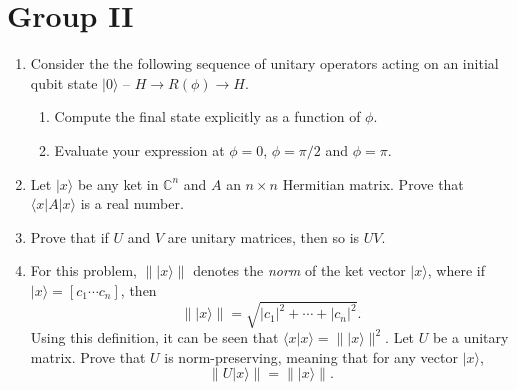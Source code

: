 \documentclass[12pt]{article}
\begin{document}
\section*{Group II}

\begin{enumerate}
\item 
Consider the the following sequence of unitary operators acting on an initial qubit state $|0\rangle$ -- $H \rightarrow R(\phi) \rightarrow H$.
\begin{enumerate}
\item Compute the final state explicitly as a function of $\phi$.
\item Evaluate your expression at $\phi = 0$, $\phi=\pi/2$ and $\phi = \pi$.
\end{enumerate}
\item 
Let $|x\rangle$ be any ket in $\mathbb{C}^n$ and $A$ an $n\times n$ Hermitian matrix.
Prove that $\langle x|A|x\rangle$ is a real number. 
\item Prove that if $U$ and $V$ are unitary matrices, then so is $UV$.
\item For this problem, $\||x\rangle\|$ denotes the \textit{norm} of the ket vector $|x\rangle$, where if $|x\rangle=[c_1 \cdots c_n]$, then $$\||x\rangle\|=\sqrt{|c_1|^2+\cdots +|c_n|^2}.$$ Using this definition, it can be seen that $\langle x|x\rangle=\||x\rangle\|^2$. Let $U$ be a unitary matrix.
Prove that $U$ is norm-preserving, meaning that for any vector $|x\rangle$,
\[
\|U|x\rangle\| = \||x\rangle\|.
\]
\end{enumerate}
\end{document}
